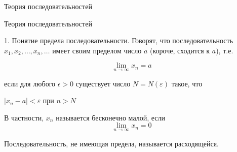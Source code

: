 \documentclass{article}
\begin{document}
    
Теория последовательностей

Теория последовательностей

1. Понятие предела последовательности. Говорят, что последовательность $x_1,x_2,\ldots,x_n, \ldots$ имеет своим пределом число $a$ (короче, сходится к $a$), т.е.

\[
\lim_{n \to \infty} x_n = a
\]

если для любого $\epsilon > 0$ существует число $N = N(\varepsilon)$ такое, что

$|x_n - a| < \varepsilon$ при $n > N$

В частности, $x_n$ называется бесконечно малой, если
\[
\lim_{n \to \infty} x_n = 0
\]

Последовательность, не имеющая предела, называется расходящейся.
    
\end{document}
